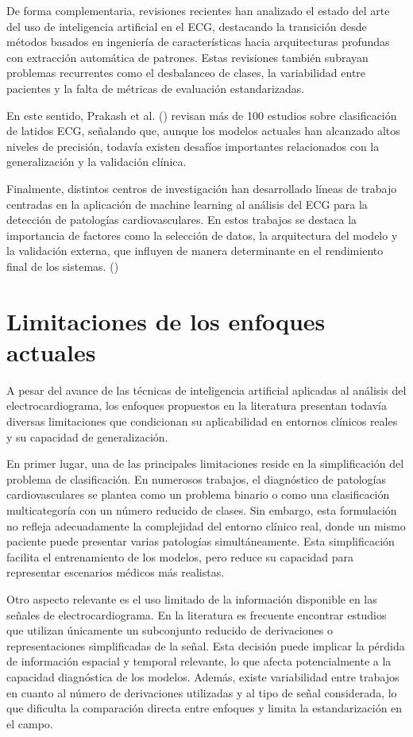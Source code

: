\documentclass[12pt,a4paper,twoside]{book}
\begin{document}
De forma complementaria, revisiones recientes han analizado el estado del arte del uso de inteligencia artificial en el ECG, destacando la transición desde métodos basados en ingeniería de características hacia arquitecturas profundas con extracción automática de patrones. 
Estas revisiones también subrayan problemas recurrentes como el desbalanceo de clases, la variabilidad entre pacientes y la falta de métricas de evaluación estandarizadas.

En este sentido, Prakash et al. (\cite{prakash2025ecg_review}) revisan más de 100 estudios sobre clasificación de latidos ECG, señalando que, aunque los modelos actuales han alcanzado altos niveles de precisión, todavía existen desafíos importantes relacionados con la generalización y la validación clínica.

Finalmente, distintos centros de investigación han desarrollado líneas de trabajo centradas en la aplicación de machine learning al análisis del ECG para la detección de patologías cardiovasculares. 
En estos trabajos se destaca la importancia de factores como la selección de datos, la arquitectura del modelo y la validación externa, que influyen de manera determinante en el rendimiento final de los sistemas. (\cite{utah_ceg_machine_learning})

\section{Limitaciones de los enfoques actuales}

A pesar del avance de las técnicas de inteligencia artificial aplicadas al análisis del electrocardiograma, los enfoques propuestos en la literatura presentan todavía diversas limitaciones que condicionan su aplicabilidad en entornos clínicos reales y su capacidad de generalización.

En primer lugar, una de las principales limitaciones reside en la simplificación del problema de clasificación. 
En numerosos trabajos, el diagnóstico de patologías cardiovasculares se plantea como un problema binario o como una clasificación multicategoría con un número reducido de clases. 
Sin embargo, esta formulación no refleja adecuadamente la complejidad del entorno clínico real, donde un mismo paciente puede presentar varias patologías simultáneamente. 
Esta simplificación facilita el entrenamiento de los modelos, pero reduce su capacidad para representar escenarios médicos más realistas.

Otro aspecto relevante es el uso limitado de la información disponible en las señales de electrocardiograma. 
En la literatura es frecuente encontrar estudios que utilizan únicamente un subconjunto reducido de derivaciones o representaciones simplificadas de la señal. 
Esta decisión puede implicar la pérdida de información espacial y temporal relevante, lo que afecta potencialmente a la capacidad diagnóstica de los modelos. 
Además, existe variabilidad entre trabajos en cuanto al número de derivaciones utilizadas y al tipo de señal considerada, lo que dificulta la comparación directa entre enfoques y limita la estandarización en el campo.
\end{document}
